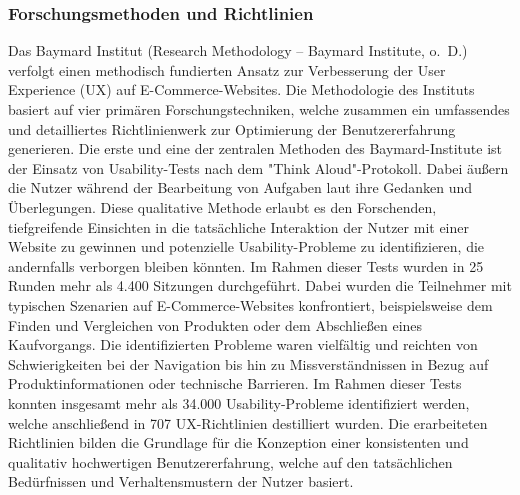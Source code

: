 \subsubsection{Forschungsmethoden und Richtlinien}
\label{forschungsmethoden_und_richtlinien}
Das Baymard Institut (Research Methodology – Baymard Institute, o. D.) verfolgt einen methodisch fundierten Ansatz zur Verbesserung der User Experience (UX) auf E-Commerce-Websites. Die Methodologie des Instituts basiert auf vier primären Forschungstechniken, welche zusammen ein umfassendes und detailliertes Richtlinienwerk zur Optimierung der Benutzererfahrung generieren. Die erste und eine der zentralen Methoden des Baymard-Institute ist der Einsatz von Usability-Tests nach dem "Think Aloud"-Protokoll. Dabei äußern die Nutzer während der Bearbeitung von Aufgaben laut ihre Gedanken und Überlegungen. Diese qualitative Methode erlaubt es den Forschenden, tiefgreifende Einsichten in die tatsächliche Interaktion der Nutzer mit einer Website zu gewinnen und potenzielle Usability-Probleme zu identifizieren, die andernfalls verborgen bleiben könnten. Im Rahmen dieser Tests wurden in 25 Runden mehr als 4.400 Sitzungen durchgeführt. Dabei wurden die Teilnehmer mit typischen Szenarien auf E-Commerce-Websites konfrontiert, beispielsweise dem Finden und Vergleichen von Produkten oder dem Abschließen eines Kaufvorgangs. Die identifizierten Probleme waren vielfältig und reichten von Schwierigkeiten bei der Navigation bis hin zu Missverständnissen in Bezug auf Produktinformationen oder technische Barrieren. Im Rahmen dieser Tests konnten insgesamt mehr als 34.000 Usability-Probleme identifiziert werden, welche anschließend in 707 UX-Richtlinien destilliert wurden. Die erarbeiteten Richtlinien bilden die Grundlage für die Konzeption einer konsistenten und qualitativ hochwertigen Benutzererfahrung, welche auf den tatsächlichen Bedürfnissen und Verhaltensmustern der Nutzer basiert.

